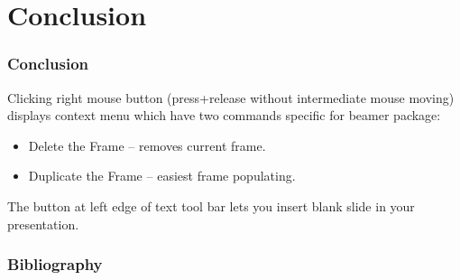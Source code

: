 \documentclass{beamer}
\begin{document}
\section*{Conclusion}

\begin{frame}
  \frametitle{Conclusion}

  Clicking right mouse button 
  (press+release without intermediate mouse moving) 
  displays context menu
  which have two commands specific for beamer package: 

  \begin{itemize}
  \item
     \alert{Delete the Frame} -- removes current frame.
  \item
     \alert{Duplicate the Frame} -- easiest frame populating.
  \end{itemize}

  The button 
  at left edge of text 
  tool bar lets you insert blank slide in your presentation.

\end{frame}


\begin{frame}[allowframebreaks]
\frametitle{Bibliography}
\printbibliography
\end{frame}
\end{document}
